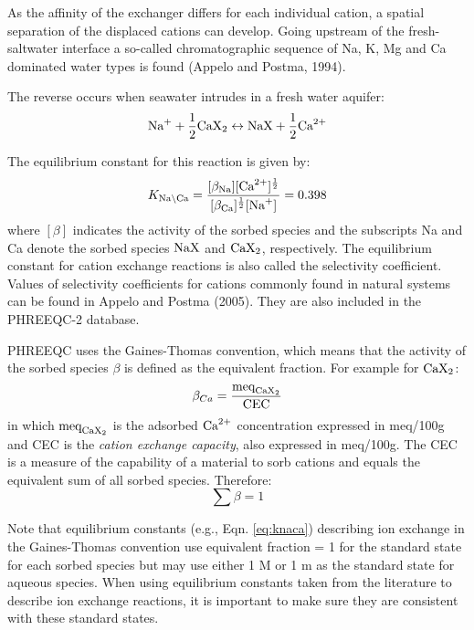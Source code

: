 As the affinity of the exchanger differs for each individual cation, a spatial separation of the displaced cations can develop. Going upstream of the fresh- saltwater interface a so-called chromatographic sequence of Na, K, Mg and Ca dominated water types is found (Appelo and Postma, 1994). 

The reverse occurs when seawater intrudes in a fresh water aquifer:
\begin{equation}
\text{Na}^{+} + \frac{1}{2} \text{CaX}_{2} \leftrightarrow \text{NaX} + \frac{1}{2} \text{Ca}^{2+}
\end{equation}

The equilibrium constant for this reaction is given by:
\begin{equation}
K_{\text{Na} \backslash \text{Ca}} = \frac{[\beta_{\text{Na}}][\text{Ca}^{2+}]^{\frac{1}{2}}}{[\beta_{\text{Ca}}]^{\frac{1}{2}}[\text{Na}^{+}]} = 0.398
\label{eq:knaca}
\end{equation}
where $[\beta]$ indicates the activity of the sorbed species and the subscripts Na and Ca denote the sorbed species $\text{NaX}$ and $\text{CaX}_{2}$, respectively. The equilibrium constant for cation exchange reactions is also called the selectivity coefficient. Values of selectivity coefficients for cations commonly found in natural systems can be found in Appelo and Postma (2005). They are also included in the PHREEQC-2 database.

PHREEQC uses the Gaines-Thomas convention, which means that the activity of the sorbed species $\beta$ is defined as the equivalent fraction. For example for $\text{CaX}_{2}$:
\begin{equation}
\beta_{Ca} = \frac{\text{meq}_{\text{CaX}_{2}}}{\text{CEC}}
\end{equation}
in which $\text{meq}_{\text{CaX}_{2}}$ is the adsorbed $\text{Ca}^{2+}$ concentration expressed in meq/100g and CEC is the \textit{cation exchange capacity}, also expressed in meq/100g. The CEC is a measure of the capability of a material to sorb cations and equals the equivalent sum of all sorbed species. Therefore:
\begin{equation}
\sum \beta = 1
\label{eq:betas}
\end{equation}

Note that equilibrium constants (e.g., Eqn. \ref{eq:knaca}) describing ion exchange in the Gaines-Thomas convention use equivalent fraction = 1 for the standard state for each sorbed species but may use either 1 M or 1 m as the standard state for aqueous species.  When using equilibrium constants taken from the literature to describe ion exchange reactions, it is important to make sure they are consistent with these standard states.

